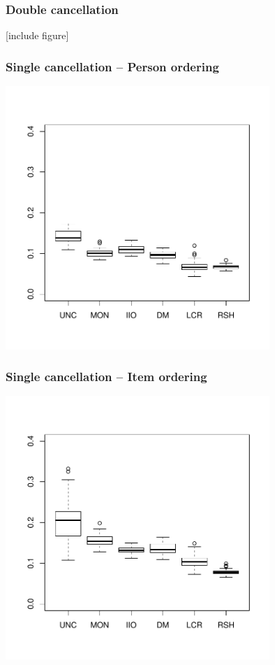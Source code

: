\documentclass[10pt,serif,professionalfont]{beamer}
\begin{document}
\begin{frame}
    \frametitle{Double cancellation}

    [include figure]

\end{frame}

\begin{frame}
    \frametitle{Single cancellation -- Person ordering}

    \centering \includegraphics[width=0.75\textwidth]{./figs/violations_columns_weighted.pdf}

\end{frame}

\begin{frame}
    \frametitle{Single cancellation -- Item ordering}

    \centering \includegraphics[width=0.75\textwidth]{./figs/violations_rows_weighted.pdf}

\end{frame}
\end{document}
